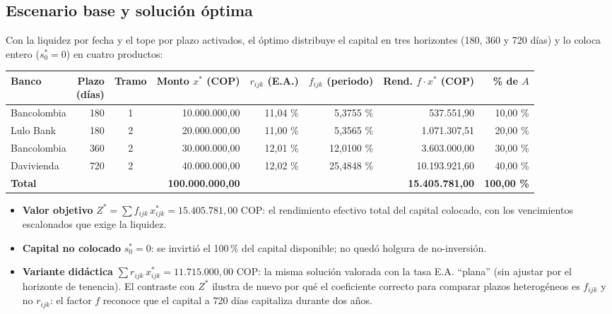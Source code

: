 \documentclass[11pt,a4paper]{article}
\begin{document}
\subsection{Escenario base y solución óptima}

Con la liquidez por fecha y el tope por plazo activados, el óptimo distribuye el capital en
tres horizontes (180, 360 y 720 días) y lo coloca entero ($s_0^* = 0$) en cuatro productos:

\begin{center}
\small
\setlength{\tabcolsep}{4pt}
\begin{tabular}{l r c r r r r r}
\toprule
Banco & \shortstack{Plazo\\(días)} & Tramo & \shortstack{Monto $x^*$\\(COP)} & \shortstack{$r_{ijk}$\\(E.A.)} & \shortstack{$f_{ijk}$\\(periodo)} & \shortstack{Rend. $f\cdot x^*$\\(COP)} & \shortstack{\% de\\$A$} \\
\midrule
Bancolombia & 180 & 1 & 10.000.000,00 & 11,04 \% & 5,3755 \% & 537.551,90 & 10,00 \% \\
Lulo Bank & 180 & 2 & 20.000.000,00 & 11,00 \% & 5,3565 \% & 1.071.307,51 & 20,00 \% \\
Bancolombia & 360 & 2 & 30.000.000,00 & 12,01 \% & 12,0100 \% & 3.603.000,00 & 30,00 \% \\
Davivienda & 720 & 2 & 40.000.000,00 & 12,02 \% & 25,4848 \% & 10.193.921,60 & 40,00 \% \\
\midrule
\textbf{Total} & & & \textbf{100.000.000,00} & & & \textbf{15.405.781,00} & \textbf{100,00 \%} \\
\bottomrule
\end{tabular}
\end{center}

\begin{itemize}
  \item \textbf{Valor objetivo} $Z^* = \sum f_{ijk}\,x^*_{ijk} = 15.405.781{,}00$ COP: el
  rendimiento efectivo total del capital colocado, con los vencimientos
  escalonados que exige la liquidez.
  \item \textbf{Capital no colocado} $s_0^* = 0$: se invirtió el 100\,\% del capital
  disponible; no quedó holgura de no-inversión.
  \item \textbf{Variante didáctica} $\sum r_{ijk}\,x^*_{ijk} = 11.715.000{,}00$ COP: la misma
  solución valorada con la tasa E.A. ``plana'' (sin ajustar por el horizonte de
  tenencia). El contraste con $Z^*$ ilustra de nuevo por qué el coeficiente
  correcto para comparar plazos heterogéneos es $f_{ijk}$ y no $r_{ijk}$: el
  factor $f$ reconoce que el capital a 720 días capitaliza durante dos años.
\end{itemize}
\end{document}
